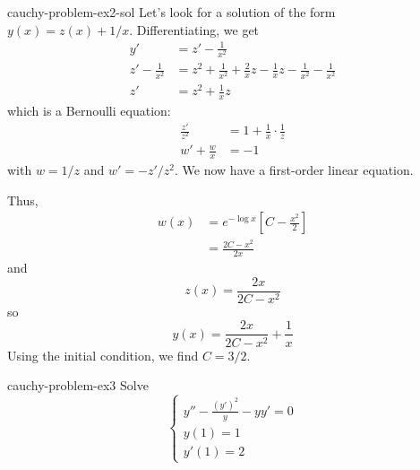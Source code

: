 \documentclass[preview]{standalone}
\begin{document}
\begin{snippetsolution}{cauchy-problem-ex2-sol}{}
    Let's look for a solution of the form \(y(x) = z(x) + 1/x\).
    Differentiating, we get
    \begin{align*}
        y' &= z' - \frac{1}{x^2} \\
        z' - \frac{1}{x^2} &= z^2 + \frac{1}{x^2} + \frac{2}{x}z - \frac{1}{x}z - \frac{1}{x^2} - \frac{1}{x^2} \\
        z' &= z^2 + \frac{1}{x}z
    \end{align*}
    which is a Bernoulli equation:
    \begin{align*}
        \frac{z'}{z^2} &= 1 + \frac{1}{x} \cdot \frac{1}{z} \\
        w' + \frac{w}{x} &= -1
    \end{align*}
    with \(w = 1/z\) and \(w' = -z'/z^2\).
    We now have a first-order linear equation.

    Thus,
    \begin{align*}
        w(x) &= e^{-\log x} \left[
            C - \frac{x^2}{2}
        \right] \\
        &= \frac{2C - x^2}{2x}
    \end{align*}
    and
    \[
        z(x) = \frac{2x}{2C - x^2}
    \]
    so
    \[
        y(x) = \frac{2x}{2C - x^2} + \frac{1}{x}
    \]
    Using the initial condition, we find \(C = 3/2\).
\end{snippetsolution}

\begin{snippetexercise}{cauchy-problem-ex3}{}
    Solve
    \[
        \begin{cases}
            y'' - \frac{{(y')}^2}{y} - yy' = 0 \\
            y(1) = 1 \\
            y'(1) = 2
        \end{cases}
    \]
\end{snippetexercise}
\end{document}
